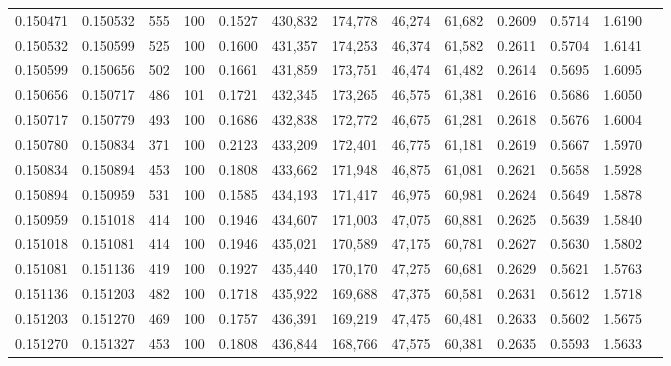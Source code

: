 \begin{tabular}{rrrrrrrrrrrrr}
0.150471 & 0.150532 &   555 & 100 &                                     0.1527 & 430,832 & 174,778 &  46,274 &  61,682 & 0.2609 & 0.5714 & 1.6190 \\
0.150532 & 0.150599 &   525 & 100 &                                     0.1600 & 431,357 & 174,253 &  46,374 &  61,582 & 0.2611 & 0.5704 & 1.6141 \\
0.150599 & 0.150656 &   502 & 100 &                                     0.1661 & 431,859 & 173,751 &  46,474 &  61,482 & 0.2614 & 0.5695 & 1.6095 \\
0.150656 & 0.150717 &   486 & 101 &                                     0.1721 & 432,345 & 173,265 &  46,575 &  61,381 & 0.2616 & 0.5686 & 1.6050 \\
0.150717 & 0.150779 &   493 & 100 &                                     0.1686 & 432,838 & 172,772 &  46,675 &  61,281 & 0.2618 & 0.5676 & 1.6004 \\
0.150780 & 0.150834 &   371 & 100 &                                     0.2123 & 433,209 & 172,401 &  46,775 &  61,181 & 0.2619 & 0.5667 & 1.5970 \\
0.150834 & 0.150894 &   453 & 100 &                                     0.1808 & 433,662 & 171,948 &  46,875 &  61,081 & 0.2621 & 0.5658 & 1.5928 \\
0.150894 & 0.150959 &   531 & 100 &                                     0.1585 & 434,193 & 171,417 &  46,975 &  60,981 & 0.2624 & 0.5649 & 1.5878 \\
0.150959 & 0.151018 &   414 & 100 &                                     0.1946 & 434,607 & 171,003 &  47,075 &  60,881 & 0.2625 & 0.5639 & 1.5840 \\
0.151018 & 0.151081 &   414 & 100 &                                     0.1946 & 435,021 & 170,589 &  47,175 &  60,781 & 0.2627 & 0.5630 & 1.5802 \\
0.151081 & 0.151136 &   419 & 100 &                                     0.1927 & 435,440 & 170,170 &  47,275 &  60,681 & 0.2629 & 0.5621 & 1.5763 \\
0.151136 & 0.151203 &   482 & 100 &                                     0.1718 & 435,922 & 169,688 &  47,375 &  60,581 & 0.2631 & 0.5612 & 1.5718 \\
0.151203 & 0.151270 &   469 & 100 &                                     0.1757 & 436,391 & 169,219 &  47,475 &  60,481 & 0.2633 & 0.5602 & 1.5675 \\
0.151270 & 0.151327 &   453 & 100 &                                     0.1808 & 436,844 & 168,766 &  47,575 &  60,381 & 0.2635 & 0.5593 & 1.5633 \\

\end{tabular}
